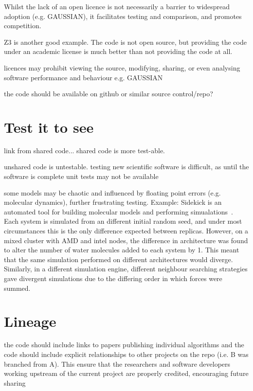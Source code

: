 \documentclass[conference]{IEEEtran}
\begin{document}
Whilst the lack of an open licence is not necessarily a barrier to
widespread adoption (e.g. GAUSSIAN), it facilitates testing and
comparison, and promotes competition.

Z3 is another good example. The code is not open source, but providing
the code under an academic license is much better than not providing
the code at all.

licences may prohibit viewing the source, modifying, sharing, or even
analysing software performance and behaviour e.g. GAUSSIAN~\cite{Giles2004}

the code should be available on github or similar source control/repo?

\section{Test it to see}
link from shared code... shared code is more test-able. 

unshared code is untestable.  testing new scientific software is
difficult, as until the software is complete unit tests may not be
available

some models may be chaotic and influenced by floating point errors
(e.g. molecular dynamics), further frustrating testing. Example:
Sidekick is an automated tool for building molecular models and
performing simualations~\cite{Hall2014Sidekick}. Each system is
simulated from an different initial random seed, and under most
circumstances this is the only difference expected between
replicas. However, on a mixed cluster with AMD and intel nodes, the
difference in architecture was found to alter the number of water
molecules added to each system by 1. This meant that the same
simulation performed on different architectures would
diverge. Similarly, in a different simulation engine, different
neighbour searching strategies gave divergent simulations due to the
differing order in which forces were summed.



\section{Lineage} 

the code should include links to papers publishing individual
algorithms and the code should include explicit relationships to other
projects on the repo (i.e. B was branched from A). This ensure that
the researchers and software developers working upstream of the
current project are properly credited, encouraging future sharing
\end{document}
